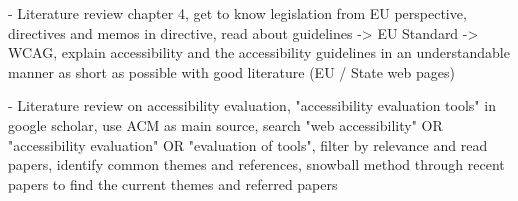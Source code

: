 - Literature review chapter 4, get to know legislation from EU perspective, directives and memos in directive, read about guidelines -> EU Standard -> WCAG, explain accessibility and the accessibility guidelines in an understandable manner as short as possible with good literature (EU / State web pages)

- Literature review on accessibility evaluation, "accessibility evaluation tools" in google scholar, use ACM as main source, search "web accessibility" OR "accessibility evaluation" OR "evaluation of tools", filter by relevance and read papers, identify common themes and references, snowball method through recent papers to find the current themes and referred papers
